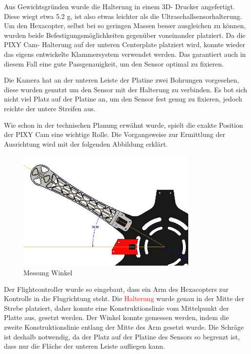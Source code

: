 	Aus Gewichtsgründen wurde die Halterung in einem 3D- Drucker angefertigt.
	Diese wiegt etwa 5.2 g, ist also etwas leichter als die Ultraschallsensorhalterung.
	Um den Hexacopter, selbst bei so geringen Massen besser ausgleichen zu können, wurden beide Befestigungsmöglichkeiten gegenüber voneinander platziert.
	Da die PIXY Cam- Halterung auf der unteren Centerplate platziert wird, konnte wieder das eigens entwickelte Klammersystem verwendet werden.
	Das garantiert auch in diesem Fall eine gute Passgenauigkeit, um den Sensor optimal zu fixieren.

	Die Kamera hat an der unteren Leiste der Platine zwei Bohrungen vorgesehen, diese wurden genutzt um den Sensor mit der Halterung zu verbinden.
	Es bot sich nicht viel Platz auf der Platine an, um den Sensor fest genug zu fixieren, jedoch reichte der untere Streifen aus.

	Wie schon in der technischen Planung erwähnt wurde, spielt die exakte Position der PIXY Cam eine wichtige Rolle.
	Die Vorgangsweise zur Ermittlung der Ausrichtung wird mit der folgenden Abbildung erklärt.

			\begin{figure}[tbh]
			\begin{centering}
			\includegraphics[width = 0.8\textwidth]{Bilder/winkel_pixy}
			\par\end{centering}
			\caption{Messung Winkel}
			\label{winkel_pixy}
			\end{figure}

	Der Flightcontroller wurde so eingebaut, dass ein Arm des Hexacopters zur Kontrolle in die Flugrichtung steht.
	Die \textcolor{red}{Halterung} wurde genau in der Mitte der Strebe platziert, daher konnte eine Konstruktionslinie vom Mittelpunkt der Platte aus, gesetzt werden.
	Der Winkel konnte gemessen werden, indem die zweite Konstruktionslinie entlang der Mitte des Arm gesetzt wurde.
	Die Schräge ist deshalb notwendig, da der Platz auf der Platine des Sensors so begrenzt ist, dass nur die Fläche der unteren Leiste aufliegen kann.

